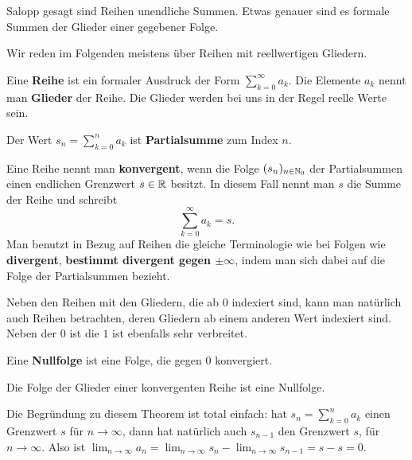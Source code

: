 \begin{bem} 
	Salopp gesagt sind Reihen unendliche Summen. Etwas genauer sind es formale Summen der Glieder einer gegebener Folge. 
	
	Wir reden im Folgenden meistens über Reihen mit reellwertigen Gliedern. 
\end{bem} 

\begin{defn}[Reihe] Eine \textbf{Reihe} ist ein formaler Ausdruck der Form $\sum_{k=0}^\infty a_k$. 
	Die Elemente $a_k$ nennt man \textbf{Glieder} der Reihe. Die Glieder werden bei uns in der Regel reelle Werte sein. 
	
	Der Wert $s_n = \sum_{k=0}^n a_k$ ist \textbf{Partialsumme} zum Index $n$. 
	
	Eine Reihe nennt man \textbf{konvergent}, wenn die Folge $(s_n)_{n \in \mathbb{N}_0}$ der Partialsummen einen endlichen Grenzwert $s \in \mathbb{R}$ besitzt. In diesem Fall nennt man $s$ die Summe der Reihe und schreibt 
	\[
		\sum_{k=0}^\infty a_k = s. 
	\]
	Man benutzt in Bezug auf Reihen die gleiche Terminologie wie bei Folgen wie \textbf{divergent}, \textbf{bestimmt divergent gegen $\pm \infty$}, indem man sich dabei auf die Folge der Partialsummen bezieht. 
\end{defn} 

\begin{bem}
	Neben den Reihen mit den Gliedern, die ab $0$ indexiert sind, kann man natürlich auch Reihen betrachten, deren Gliedern ab einem anderen Wert indexiert sind. Neben der $0$ ist die $1$ ist ebenfalls sehr verbreitet. 
\end{bem} 

\begin{defn} 
	Eine \textbf{Nullfolge} ist eine Folge, die gegen $0$ konvergiert. 
\end{defn} 

\begin{thm} 
	Die Folge der Glieder einer konvergenten Reihe ist eine Nullfolge. 
\end{thm} 

\begin{bem}
	Die Begründung zu diesem Theorem ist total einfach: hat $s_n = \sum_{k=0}^n a_k$ einen Grenzwert $s$ für $n \to \infty$, dann hat natürlich auch $s_{n-1}$ den Grenzwert $s$, für $n \to \infty$. Also ist $\lim_{n \to \infty} a_n = \lim_{n \to \infty} s_n - \lim_{n \to \infty} s_{n-1} = s-s = 0$. 
\end{bem} 

